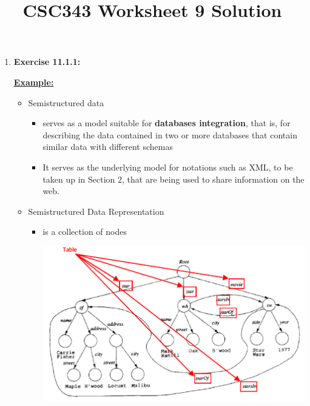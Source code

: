 \documentclass[12pt]{article}
\begin{document}
\title{CSC343 Worksheet 9 Solution}
\maketitle

\bigskip

\begin{enumerate}[1.]
    \item \textbf{Exercise 11.1.1:}

    \bigskip

    \underline{\textbf{Example:}}

    \begin{itemize}
        \item Semistructured data
        \begin{itemize}
            \item serves as a model suitable for \textbf{databases integration}, that is,
            for describing the data contained in two or more databases that contain similar data with
            different schemas

            \item It serves as the underlying model for notations such as XML, to be taken
            up in Section 2, that are being used to share information on the web.
        \end{itemize}

        \item Semistructured Data Representation
        \begin{itemize}
            \item is a collection of nodes

        \begin{center}
        \includegraphics[width=\linewidth]{images/worksheet_9_solution_1.png}
        \end{center}


\end{itemize}
\end{itemize}
\end{enumerate}
\end{document}

